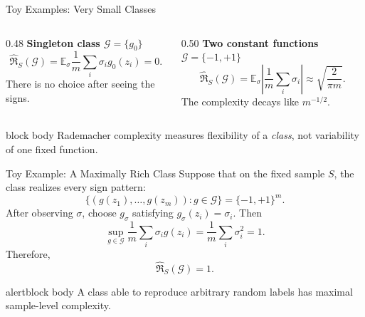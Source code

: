 \documentclass[aspectratio=169,10pt]{beamer}
\newcommand{\Gc}{\mathcal{G}}
\newcommand{\RadS}{\widehat{\mathfrak{R}}_S}
\newcommand{\pmone}{\{-1,+1\}}
\newcommand{\E}{\mathbb{E}}
\newcommand{\abs}[1]{\left\lvert #1\right\rvert}
\newcommand{\KeyBox}[1]{%
  \begin{beamercolorbox}[rounded=true,sep=0.22cm,wd=\linewidth]{block body}
    #1
  \end{beamercolorbox}%
}
\newcommand{\OrangeBox}[1]{%
  \begin{beamercolorbox}[rounded=true,sep=0.22cm,wd=\linewidth]{alertblock body}
    #1
  \end{beamercolorbox}%
}
\begin{document}
\begin{frame}[t]{Toy Examples: Very Small Classes}
  \vspace{0.06cm}
  \begin{columns}[T,totalwidth=\textwidth]
    \begin{column}{0.48\textwidth}
      \textbf{Singleton class $\Gc=\{g_0\}$}
      \[
        \RadS(\Gc)
        =\E_\sigma\frac{1}{m}\sum_i\sigma_i g_0(z_i)=0.
      \]
      There is no choice after seeing the signs.
    \end{column}
    \begin{column}{0.50\textwidth}
      \textbf{Two constant functions $\Gc=\{-1,+1\}$}
      \[
        \RadS(\Gc)
        =\E_\sigma\abs{\frac{1}{m}\sum_i\sigma_i}
        \approx \sqrt{\frac{2}{\pi m}}.
      \]
      The complexity decays like $m^{-1/2}$.
    \end{column}
  \end{columns}
  \vspace{0.20cm}
  \KeyBox{Rademacher complexity measures flexibility of a \emph{class}, not variability of one fixed function.}
\end{frame}

\begin{frame}[t]{Toy Example: A Maximally Rich Class}
  \vspace{0.06cm}
  Suppose that on the fixed sample $S$, the class realizes every sign pattern:
  \[
    \{(g(z_1),\ldots,g(z_m)):g\in\Gc\}=\pmone^m.
  \]
  After observing $\sigma$, choose $g_\sigma$ satisfying $g_\sigma(z_i)=\sigma_i$. Then
  \[
    \sup_{g\in\Gc}\frac{1}{m}\sum_i\sigma_i g(z_i)
    =\frac{1}{m}\sum_i\sigma_i^2=1.
  \]
  Therefore,
  \[
    \boxed{\RadS(\Gc)=1.}
  \]
  \vspace{0.08cm}
  \OrangeBox{A class able to reproduce arbitrary random labels has maximal sample-level complexity.}
\end{frame}
\end{document}
